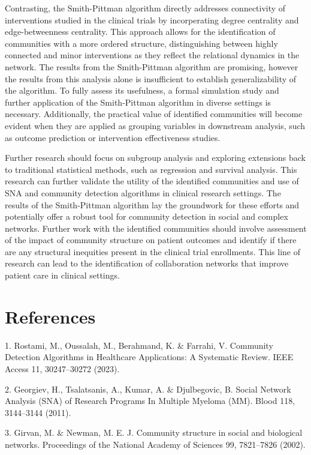 Contrasting, the Smith-Pittman algorithm directly addresses connectivity
of interventions studied in the clinical trials by incorperating degree
centrality and edge-betweenness centrality. This approach allows for the
identification of communities with a more ordered structure,
distinguishing between highly connected and minor interventions as they
reflect the relational dynamics in the network. The results from the
Smith-Pittman algorithm are promising, however the results from this
analysis alone is insufficient to establish generalizability of the
algorithm. To fully assess its usefulness, a formal simulation study and
further application of the Smith-Pittman algorithm in diverse settings
is necessary. Additionally, the practical value of identified
communities will become evident when they are applied as grouping
variables in downstream analysis, such as outcome prediction or
intervention effectiveness studies.

Further research should focus on subgroup analysis and exploring
extensions back to traditional statistical methods, such as regression
and survival analysis. This research can further validate the utility of
the identified communities and use of SNA and community detection
algorithms in clinical research settings. The results of the
Smith-Pittman algorithm lay the groundwork for these efforts and
potentially offer a robust tool for community detection in social and
complex networks. Further work with the identified communities should
involve assessment of the impact of community structure on patient
outcomes and identify if there are any structural inequities present in
the clinical trial enrollments. This line of research can lead to the
identification of collaboration networks that improve patient care in
clinical settings.

\section{References}\label{references}

1. Rostami, M., Oussalah, M., Berahmand, K. \& Farrahi, V. Community
Detection Algorithms in Healthcare Applications: A Systematic Review.
IEEE Access 11, 30247--30272 (2023).

2. Georgiev, H., Tsalatsanis, A., Kumar, A. \& Djulbegovic, B. Social
Network Analysis (SNA) of Research Programs In Multiple Myeloma (MM).
Blood 118, 3144--3144 (2011).

3. Girvan, M. \& Newman, M. E. J. Community structure in social and
biological networks. Proceedings of the National Academy of Sciences 99,
7821--7826 (2002).

